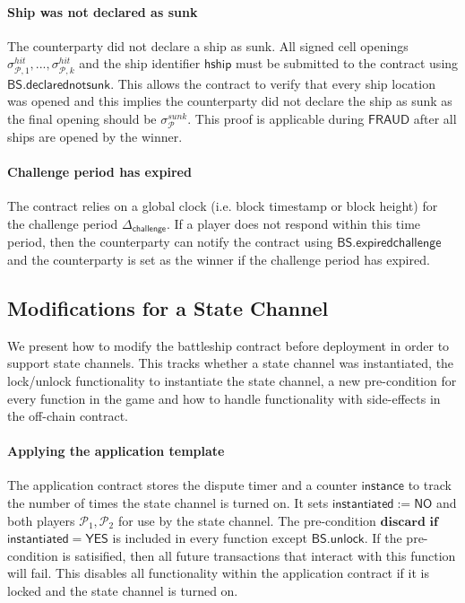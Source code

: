 \documentclass{llncs}
\newcommand{\instantiated}{\mathsf{instantiated}}
\newcommand{\instantiatedno}{\mathsf{NO}}
\newcommand{\instantiatedyes}{\mathsf{YES}}
\newcommand{\gamefraud}{\mathsf{FRAUD}}
\newcommand{\hship}{\mathsf{hship}}
\newcommand{\participant}{\mathcal{P}}
\newcommand{\battleshipdeclarednotsunk}{\mathsf{BS.declarednotsunk}}
\newcommand{\battleshipchallengeexpired}{\mathsf{BS.expiredchallenge}}
\newcommand{\battleshipunlock}{\mathsf{BS.unlock}}
\newcommand{\timerchallenge}{\mathsf{\Delta}_{\mathsf{challenge}}}
\begin{document}
\paragraph{Ship was not declared as sunk}
The counterparty did not declare a ship as sunk. 
All signed cell openings $\sigma^{hit}_{\participant,1},...,\sigma^{hit}_{\participant,k}$ and the ship identifier $\hship$ must be submitted to the contract using $\battleshipdeclarednotsunk$. 
This allows the contract to verify that every ship location was opened and this implies the counterparty did not declare the ship as sunk as the final opening should be $\sigma^{sunk}_{\participant}$. 
This proof is applicable during $\gamefraud$ after all ships are opened by the winner. 

\paragraph{Challenge period has expired }
The contract relies on a global clock (i.e. block timestamp or block height) for the challenge period  $\timerchallenge$. 
If a player does not respond within this time period, then the counterparty can notify the contract using $\battleshipchallengeexpired$ and the counterparty is set as the winner if the challenge period has expired. 

\subsection{Modifications for a State Channel}

We present how to modify the battleship contract before deployment in order to support state channels.
This tracks whether a state channel was instantiated,  the lock/unlock functionality to instantiate the state channel, a new pre-condition for every function in the game and how to handle functionality with side-effects in the off-chain contract. 

\paragraph{Applying the application template}
The application contract stores the dispute timer and a counter $\mathsf{instance}$ to track the number of times the state channel is turned on. 
It sets $\instantiated := \instantiatedno$ and both players $\participant_{1},\participant_{2}$ for use by the state channel.
The pre-condition $\textbf{discard if}$ $ \instantiated  = \instantiatedyes$ is included in every function except $\battleshipunlock$. 
If the pre-condition is satisified, then all future transactions that interact with this function will fail.
This disables all functionality within the application contract if it is locked and the state channel is turned on. 
\end{document}
